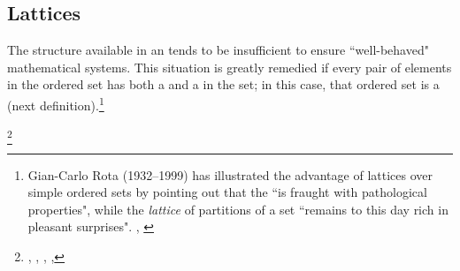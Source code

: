 

\subsection{Lattices}
The structure available in an   
tends to be insufficient to ensure ``well-behaved" mathematical systems.
This situation is greatly remedied if every pair of elements in the ordered set %
has both a  and a   in the set;
in this case, that ordered set is a  (next definition).\footnote{
Gian-Carlo Rota (1932--1999) has illustrated the advantage of lattices over simple ordered sets
by pointing out that the  
``is fraught with pathological properties", while 
the \emph{lattice} of partitions of a set 
``remains to this day rich in pleasant surprises".
{
  , %
  }}
\begin{definition}
\footnote{
  ,
  ,
  , %
  ,
  }
\label{def:lattice}
\label{def:latlin}
\end{definition}



